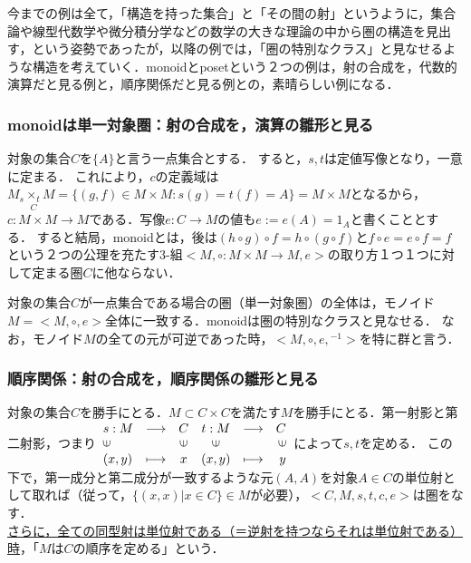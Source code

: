 \documentclass[uplatex, 12pt, a4paper, dvipdfmx]{jsarticle}
\begin{document}
今までの例は全て，「構造を持った集合」と「その間の射」というように，集合論や線型代数学や微分積分学などの数学の大きな理論の中から圏の構造を見出す，という姿勢であったが，以降の例では，「圏の特別なクラス」と見なせるような構造を考えていく．monoidとposetという２つの例は，射の合成を，代数的演算だと見る例と，順序関係だと見る例との，素晴らしい例になる．

\subsubsection{monoidは単一対象圏：射の合成を，演算の雛形と見る}

対象の集合$C$を$\{ A\}$と言う一点集合とする．
すると，$s,t$は定値写像となり，一意に定まる．
これにより，$c$の定義域は$M_s\underset{C}{\times_t}M=\{ (g,f)\in M\times M : s(g)=t(f)=A \}=M\times M$となるから，$c:M\times M\longrightarrow M$である．写像$e:C\longrightarrow M$の値も$e:=e(A)=1_A$と書くこととする．
すると結局，monoidとは，後は$(h\circ g)\circ f = h\circ (g\circ f)$と$f\circ e=e\circ f = f$という２つの公理を充たす3-組$<M,\circ :M\times M\longrightarrow M,e>$の取り方１つ１つに対して定まる圏$C$に他ならない．\\

\begin{screen}
    対象の集合$C$が一点集合である場合の圏（単一対象圏）の全体は，モノイド$M=<M,\circ,e>$全体に一致する．monoidは圏の特別なクラスと見なせる．
    なお，モノイド$M$の全ての元が可逆であった時，$<M,\circ,e,{}^{-1}>$を特に群と言う．
\end{screen}

\subsubsection{順序関係：射の合成を，順序関係の雛形と見る}

対象の集合$C$を勝手にとる．$M\subset C\times C$を満たす$M$を勝手にとる．第一射影と第二射影，つまり$\begin{array}{llccrr} s:M & \longrightarrow & C & t:M & \longrightarrow & C \\ \rotatebox{90}{$\in$} & & \rotatebox{90}{$\in$} & \rotatebox{90}{$\in$}& & \rotatebox{90}{$\in$}\\ (x,y) & \longmapsto & x & (x,y) & \longmapsto & y \end{array}$によって$s,t$を定める．
この下で，第一成分と第二成分が一致するような元$(A,A)$を対象$A\in C$の単位射として取れば（従って，$\{ (x,x) | x\in C \}\in M$が必要），$<C,M,s,t,c,e>$は圏をなす．\\
\underline{さらに，全ての同型射は単位射である（＝逆射を持つならそれは単位射である）時}，「$M$は$C$の順序を定める」という．\par
\end{document}
